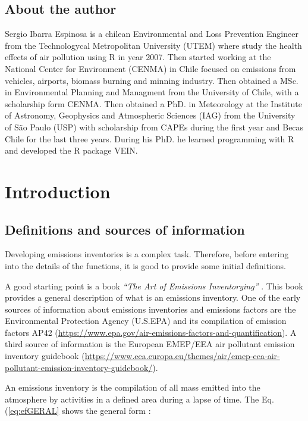 \documentclass[12pt,graybox,envcountchap,sectrefs]{krantz}
\theoremstyle{definition}
\theoremstyle{definition}
\theoremstyle{definition}
\theoremstyle{remark}
\begin{document}
\section*{About the author}\label{about-the-author}


Sergio Ibarra Espinosa is a chilean Environmental and Loss Prevention
Engineer from the Technologycal Metropolitan University (UTEM) where
study the health effects of air pollution using R in year 2007. Then
started working at the National Center for Environment (CENMA) in Chile
focused on emissions from vehicles, airports, biomass burning and
minning industry. Then obtained a MSc. in Environmental Planning and
Managment from the University of Chile, with a scholarship form CENMA.
Then obtained a PhD. in Meteorology at the Institute of Astronomy,
Geophysics and Atmospheric Sciences (IAG) from the University of São
Paulo (USP) with scholarship from CAPEs during the first year and Becas
Chile for the last three years. During his PhD. he learned programming
with R and developed the R package VEIN.

\mainmatter

\chapter{Introduction}\label{intro}

\section{Definitions and sources of
information}\label{definitions-and-sources-of-information}

Developing emissions inventories is a complex task. Therefore, before
entering into the details of the functions, it is good to provide some
initial definitions.

A good starting point is a book \emph{``The Art of Emissions
Inventorying''} \citep{pulles2010art}. This book provides a general
description of what is an emissions inventory. One of the early sources
of information about emissions inventories and emissions factors are the
Environmental Protection Agency (U.S.EPA) and its compilation of
emission factors AP42
(\url{https://www.epa.gov/air-emissions-factors-and-quantification}). A
third source of information is the European EMEP/EEA air pollutant
emission inventory guidebook
(\url{https://www.eea.europa.eu/themes/air/emep-eea-air-pollutant-emission-inventory-guidebook/}).

An emissions inventory is the compilation of all mass emitted into the
atmosphere by activities in a defined area during a lapse of time. The
Eq. (\eqref{eq:efGERAL} shows the general form \citep{guia}:
\end{document}
